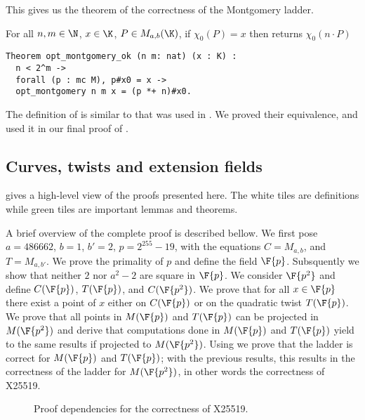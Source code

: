 This gives us the theorem of the correctness of the Montgomery ladder.
\begin{theorem}
  \label{thm:montgomery-ladder-correct}
  For all $n, m \in \N$, $x \in \K$, $P \in M_{a,b}(\K)$,
  if $\chi_0(P) = x$ then  returns $\chi_0(n \cdot P)$
\end{theorem}
\begin{lstlisting}[language=Coq]
Theorem opt_montgomery_ok (n m: nat) (x : K) :
  n < 2^m ->
  forall (p : mc M), p#x0 = x ->
  opt_montgomery n m x = (p *+ n)#x0.
\end{lstlisting}
The definition of  is similar to 
that was used in .
We proved their equivalence, and used it in our
final proof of .


\subsection{Curves, twists and extension fields}
\label{subsec:curve_twist_fields}

 gives a high-level view of the proofs presented here.
The white tiles are definitions while green tiles are important lemmas and theorems.

A brief overview of the complete proof is described bellow.
We first pose $a = 486662$, $b = 1$, $b' = 2$, $p = 2^{255}-19$, with the equations $C = M_{a,b}$, and $T = M_{a,b'}$.
We prove the primality of $p$ and define the field $\F{p}$.
Subsquently we show that neither $2$ nor $a^2 - 2$ are square in $\F{p}$.
We consider $\F{p^2}$ and define $C(\F{p})$, $T(\F{p})$, and $C(\F{p^2})$.
We prove that for all $x \in \F{p}$ there exist a point of \xcoord $x$ either on $C(\F{p})$ or on the quadratic twist $T(\F{p})$.
We prove that all points in $M(\F{p})$ and $T(\F{p})$ can be projected in $M(\F{p^2})$ and derive that computations done in $M(\F{p})$ and $T(\F{p})$ yield to the same results if projected to $M(\F{p^2})$.
Using  we prove that the ladder is correct for $M(\F{p})$ and $T(\F{p})$; with the previous results, this results in the correctness of the ladder for $M(\F{p^2})$, in other words the correctness of X25519.


\begin{figure}[h]
  \centering
  
  \caption{Proof dependencies for the correctness of X25519.}
  \label{tikz:ProofHighLevel2}
\end{figure}

